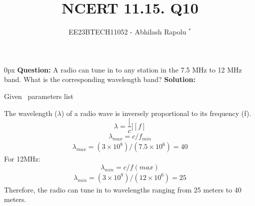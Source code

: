 \documentclass[journal,12pt,twocolumn]{IEEEtran}
\begin{document}

\vspace{3cm}
\title{NCERT 11.15. Q10}
\author{EE23BTECH11052 - Abhilash Rapolu $^{*}$%
}
\maketitle
\newpage
\bigskip
\renewcommand{\thetable}{\arabic{table}}

\parindent 0px
\textbf{Question:} A radio can tune in to any station in the 7.5 MHz to 12 MHz band.
 What is the corresponding wavelength band? 
\textbf{Solution:}  
\begin{table}[htbp] \small
\centering

\caption{Given \, parameters list}\end{table}
The wavelength ($\lambda$) of a radio wave is inversely proportional to its frequency (f).
\bgroup \obeylines
$$\lambda=\frac[c][f]$$
$$\lambda_{max}=c/f_{min}$$
\egroup
\begin{align}
\lambda_{max}=(3\times10^{8})/(7.5\times10^{6})=40
\end{align}
For 12MHz:
$$\lambda_{min}=c/f(max)$$
\begin{align}
\lambda_{min}=(3\times10^{8})/(12\times10^{6})=25
\end{align}
Therefore, the radio can tune in to wavelengths ranging from 25 meters to 40 meters.
\end{document}
